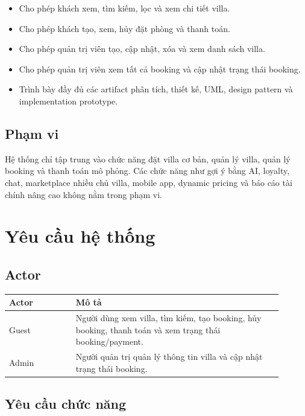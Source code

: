 \documentclass[12pt,a4paper]{article}
\begin{document}
\begin{itemize}[noitemsep]
  \item Cho phép khách xem, tìm kiếm, lọc và xem chi tiết villa.
  \item Cho phép khách tạo, xem, hủy đặt phòng và thanh toán.
  \item Cho phép quản trị viên tạo, cập nhật, xóa và xem danh sách villa.
  \item Cho phép quản trị viên xem tất cả booking và cập nhật trạng thái booking.
  \item Trình bày đầy đủ các artifact phân tích, thiết kế, UML, design pattern và implementation prototype.
\end{itemize}

\subsection{Phạm vi}

Hệ thống chỉ tập trung vào chức năng đặt villa cơ bản, quản lý villa, quản lý booking và thanh toán mô phỏng. Các chức năng như gợi ý bằng AI, loyalty, chat, marketplace nhiều chủ villa, mobile app, dynamic pricing và báo cáo tài chính nâng cao không nằm trong phạm vi.

\section{Yêu cầu hệ thống}

\subsection{Actor}

\begin{longtable}{|p{0.22\linewidth}|p{0.68\linewidth}|}
\hline
\textbf{Actor} & \textbf{Mô tả} \\
\hline
Guest & Người dùng xem villa, tìm kiếm, tạo booking, hủy booking, thanh toán và xem trạng thái booking/payment. \\
\hline
Admin & Người quản trị quản lý thông tin villa và cập nhật trạng thái booking. \\
\hline
\end{longtable}

\subsection{Yêu cầu chức năng}
\end{document}
